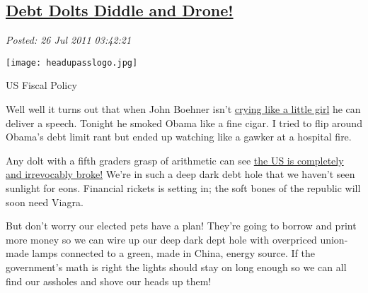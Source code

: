 %

\subsection*{\href{http://bakerjd99.wordpress.com/2011/07/25/debt-dolts-diddle-and-drone/}{Debt Dolts Diddle and Drone!}}


\noindent\emph{Posted: 26 Jul 2011 03:42:21}
\vspace{6pt}


\captionsetup[floatingfigure]{labelformat=empty}
\begin{floatingfigure}[l]{0.22\textwidth}
\centering
\texttt{[image: headupasslogo.jpg]}
\caption{US Fiscal Policy}
\label{fig:1681X0}
\end{floatingfigure}Well well it turns out that when John Boehner isn't
\href{http://www.buzzfeed.com/akdobbins/john-boehner-crying-a-comprehensive-guide}{crying
like a little girl} he can deliver a speech. Tonight he smoked Obama
like a fine cigar. I tried to flip around Obama's debt limit rant but
ended up watching like a gawker at a hospital fire.

Any dolt with a fifth graders grasp of arithmetic can see
\href{http://www.usdebtclock.org/}{the US is completely and irrevocably
broke!} We're in such a deep dark debt hole that we haven't seen
sunlight for eons. Financial rickets is setting in; the soft bones of
the republic will soon need Viagra.

But don't worry our elected pets have a plan! They're going to borrow
and print more money so we can wire up our deep dark dept hole with
overpriced union-made lamps connected to a green, made in China, energy
source. If the government's math is right the lights should stay on long
enough so we can all find our assholes and shove our heads up
them!\href{http://bakerjd99.files.wordpress.com/2011/07/headupasslogo.jpg}{}






%
